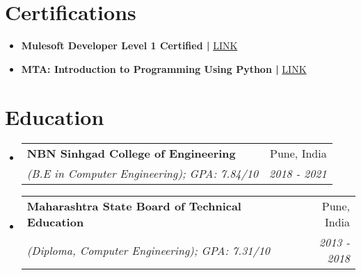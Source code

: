 \documentclass[a4paper]{article}
\makeatletter
\newcommand{\resumeItem}[2]{
  \item\small{
    \textbf{#1}{ #2 \vspace{-2pt}}
  }
}
\newcommand{\resumeSubheading}[4]{
  \vspace{-1pt}\item
    \begin{tabular*}{0.97\textwidth}{l@{\extracolsep{\fill}}r}
      \textbf{#1} & #2 \\
      \textit{\small#3} & \textit{\small #4} \\
    \end{tabular*}\vspace{-5pt}
}
\newcommand{\resumeSubItem}[2]{\resumeItem{#1}{#2}\vspace{-4pt}}
\newcommand{\resumeSubHeadingListStart}{\begin{itemize}[leftmargin=*]}
\newcommand{\resumeSubHeadingListEnd}{\end{itemize}}
\makeatother
\begin{document}
\section{Certifications}
 \resumeSubHeadingListStart
 \resumeSubItem{}{
    \textbf{Mulesoft Developer Level 1 Certified | }\href{https://www.salesforce.com/trailblazer/dxzctjcex7gh7ul9lk}{LINK}
     }
 \resumeSubItem{}{
     \textbf {MTA: Introduction to Programming Using Python | }\href{https://www.credly.com/badges/2fb462f8-eab0-4748-a68d-d2f2eb4124f0}{LINK}
}

 \resumeSubHeadingListEnd
\section{Education}
  \resumeSubHeadingListStart
    \resumeSubheading
      {NBN Sinhgad College of Engineering}{Pune, India}
      {(B.E in Computer Engineering);  GPA: 7.84/10 }{2018 - 2021}
    \resumeSubheading
      {Maharashtra State Board of Technical Education}{Pune, India}
      {(Diploma, Computer Engineering);  GPA: 7.31/10 }{2013 - 2018}
  \resumeSubHeadingListEnd
\end{document}
